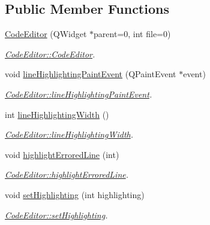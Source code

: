\subsection*{Public Member Functions}
\begin{DoxyCompactItemize}
\item 
\hyperlink{classCodeEditor_a77c9d3d8aad039e7d0b0166737baac51}{Code\+Editor} (Q\+Widget $\ast$parent=0, int file=0)
\begin{DoxyCompactList}\small\item\em \hyperlink{classCodeEditor_a77c9d3d8aad039e7d0b0166737baac51}{Code\+Editor\+::\+Code\+Editor}. \end{DoxyCompactList}\item 
void \hyperlink{classCodeEditor_aaf6208c8c957341c1834cbe38c61d989}{line\+Highlighting\+Paint\+Event} (Q\+Paint\+Event $\ast$event)
\begin{DoxyCompactList}\small\item\em \hyperlink{classCodeEditor_aaf6208c8c957341c1834cbe38c61d989}{Code\+Editor\+::line\+Highlighting\+Paint\+Event}. \end{DoxyCompactList}\item 
int \hyperlink{classCodeEditor_afdce3b62e44a12089cb94a726916e53d}{line\+Highlighting\+Width} ()
\begin{DoxyCompactList}\small\item\em \hyperlink{classCodeEditor_afdce3b62e44a12089cb94a726916e53d}{Code\+Editor\+::line\+Highlighting\+Width}. \end{DoxyCompactList}\item 
void \hyperlink{classCodeEditor_aa2b0ad14f9e7a6a1aecd6b5b4d6b1480}{highlight\+Errored\+Line} (int)
\begin{DoxyCompactList}\small\item\em \hyperlink{classCodeEditor_aa2b0ad14f9e7a6a1aecd6b5b4d6b1480}{Code\+Editor\+::highlight\+Errored\+Line}. \end{DoxyCompactList}\item 
void \hyperlink{classCodeEditor_a3a8b18e7a1b4e00965d64c2816a770a8}{set\+Highlighting} (int highlighting)
\begin{DoxyCompactList}\small\item\em \hyperlink{classCodeEditor_a3a8b18e7a1b4e00965d64c2816a770a8}{Code\+Editor\+::set\+Highlighting}. \end{DoxyCompactList}\end{DoxyCompactItemize}
